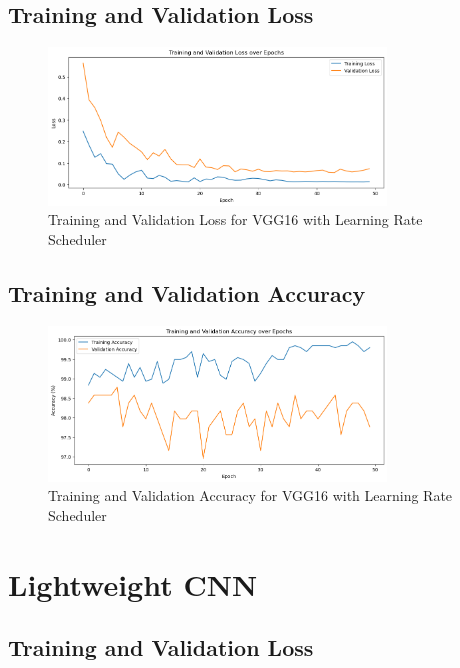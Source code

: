 \subsection{Training and Validation Loss}

\begin{figure}[htbp]
\centering
\includegraphics[width=0.8\textwidth]{train_val_err_vgg16.png}
\caption{Training and Validation Loss for VGG16 with Learning Rate Scheduler}
\end{figure}

\subsection{Training and Validation Accuracy}

\begin{figure}[htbp]
\centering
\includegraphics[width=0.8\textwidth]{train_val_acc_vgg16.png}
\caption{Training and Validation Accuracy for VGG16 with Learning Rate Scheduler}
\end{figure}

\newpage %

\section{Lightweight CNN}

\subsection{Training and Validation Loss}

